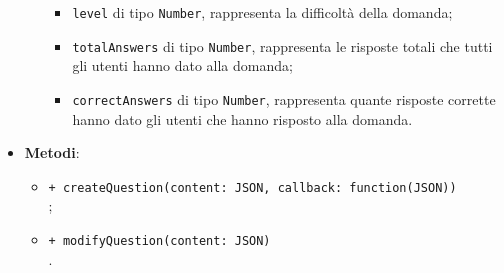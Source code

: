 \begin{itemize}
\begin{itemize}
\begin{itemize}
		\item \texttt{level} di tipo \texttt{Number}, rappresenta la difficoltà della 				domanda;
		\item \texttt{totalAnswers} di tipo \texttt{Number}, rappresenta le risposte 					totali che tutti gli utenti hanno dato alla domanda;
		\item \texttt{correctAnswers} di tipo \texttt{Number}, rappresenta quante risposte 		corrette hanno dato gli utenti che hanno risposto alla domanda.
		\end{itemize}
	\end{itemize}
\item \textbf{Metodi}:
	\begin{itemize}
	\item \texttt{+ createQuestion(content: JSON, callback: function(JSON))} \\
	;   
	\item \texttt{+ modifyQuestion(content: JSON)} \\
	.
	\end{itemize}
\end{itemize}